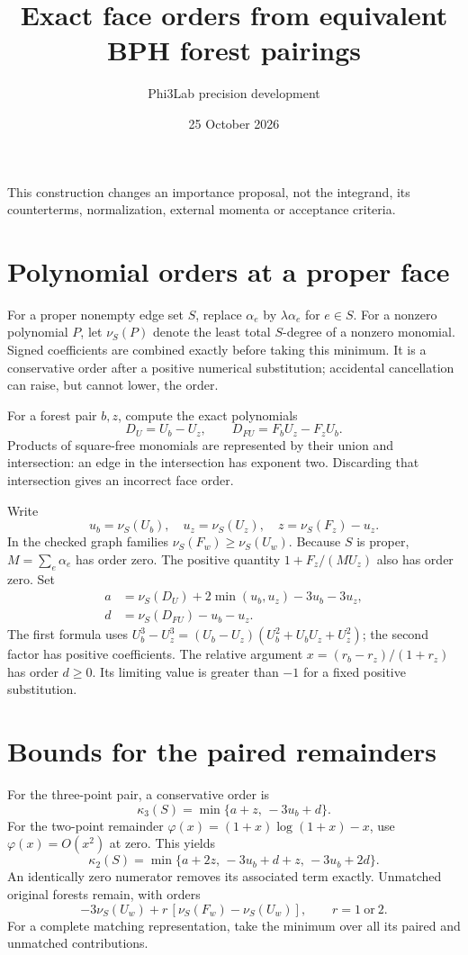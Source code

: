 \documentclass[11pt]{article}
\title{Exact face orders from equivalent BPH forest pairings}
\author{Phi3Lab precision development}
\date{25 October 2026}
\begin{document}
\maketitle
\noindent
This construction changes an importance proposal, not the integrand, its
counterterms, normalization, external momenta or acceptance criteria.

\section{Polynomial orders at a proper face}
For a proper nonempty edge set $S$, replace $\alpha_e$ by
$\lambda\alpha_e$ for $e\in S$. For a nonzero polynomial $P$,
let $\nu_S(P)$ denote the least total $S$-degree of a nonzero monomial.
Signed coefficients are combined exactly before taking this minimum.
It is a conservative order after a positive numerical substitution;
accidental cancellation can raise, but cannot lower, the order.

For a forest pair $b,z$, compute the exact polynomials
\[
 D_U=U_b-U_z,\qquad D_{FU}=F_bU_z-F_zU_b .
\]
Products of square-free monomials are represented by their union and
intersection: an edge in the intersection has exponent two.
Discarding that intersection gives an incorrect face order.

Write
\[
 u_b=\nu_S(U_b),\quad u_z=\nu_S(U_z),\quad
 z=\nu_S(F_z)-u_z .
\]
In the checked graph families $\nu_S(F_w)\geq\nu_S(U_w)$.
Because $S$ is proper, $M=\sum_e\alpha_e$ has order zero.
The positive quantity $1+F_z/(MU_z)$ also has order zero.
Set
\begin{align}
 a&=\nu_S(D_U)+2\min(u_b,u_z)-3u_b-3u_z,\\
 d&=\nu_S(D_{FU})-u_b-u_z .
\end{align}
The first formula uses
$U_b^3-U_z^3=(U_b-U_z)(U_b^2+U_bU_z+U_z^2)$;
the second factor has positive coefficients. The relative argument
$x=(r_b-r_z)/(1+r_z)$ has order $d\geq0$.
Its limiting value is greater than $-1$ for a fixed positive substitution.

\section{Bounds for the paired remainders}
For the three-point pair, a conservative order is
\[
 \kappa_3(S)=\min\{a+z,\,-3u_b+d\}.
\]
For the two-point remainder
$\varphi(x)=(1+x)\log(1+x)-x$, use
$\varphi(x)=O(x^2)$ at zero. This yields
\[
 \kappa_2(S)=\min\{a+2z,\,-3u_b+d+z,\,-3u_b+2d\}.
\]
An identically zero numerator removes its associated term exactly.
Unmatched original forests remain, with orders
\[
 -3\nu_S(U_w)+r\,[\nu_S(F_w)-\nu_S(U_w)],
 \qquad r=1\ \text{or}\ 2.
\]
For a complete matching representation, take the minimum over all its
paired and unmatched contributions.
\end{document}
